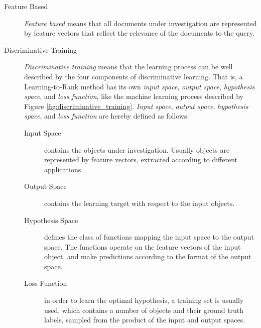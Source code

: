 \begin{description}
\item[Feature Based]{\emph{Feature based} means that all documents under investigation are represented by feature vectors that reflect the relevance of the documents to the query.}
\item[Discriminative Training]{\emph{Discriminative training} means that the learning process can be well described by the four components of discriminative learning. That is, a Learning-to-Rank method has its own \emph{input space}, \emph{output space}, \emph{hypothesis space}, and \emph{loss function}, like the machine learning process described by Figure \ref{fig:discriminative_training}. \emph{Input space}, \emph{output space}, \emph{hypothesis space}, and \emph{loss function} are hereby defined as follows:
	\begin{description}
	\item[Input Space]{contains the objects under investigation. Usually objects are represented by feature vectors, extracted according to different applications.}
	\item[Output Space]{contains the learning target with respect to the input objects.}
	\item[Hypothesis Space]{defines the class of functions mapping the input space to the output space. The functions operate on the feature vectors of the input object, and make predictions according to the format of the output space.}
	\item[Loss Function]{in order to learn the optimal hypothesis, a training set is usually used, which contains a number of objects and their ground truth labels, sampled from the product of the input and output spaces.}
	\end{description}
	}
\end{description}


